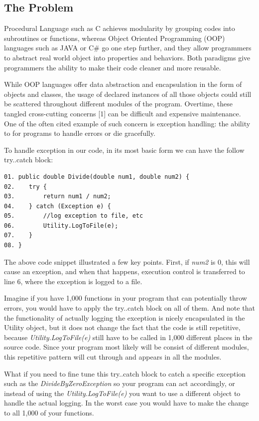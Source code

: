 \subsection{The Problem}
Procedural Language such as C achieves modularity by grouping codes into subroutines or functions, whereas Object Oriented Programming (OOP) languages such as JAVA or C\# go one step further, and they allow programmers to abstract real world object into properties and behaviors. Both paradigms give programmers the ability to make their code cleaner and more reusable.

While OOP languages offer data abstraction and encapsulation in the form of objects and classes, the usage of declared instances of all those objects could still be scattered throughout different modules of the program. Overtime, these tangled cross-cutting concerns [1] can be difficult and expensive maintenance. One of the often cited example of such concern is exception handling: the ability to for programs to handle errors or die gracefully.

To handle exception in our code, in its most basic form we can have the follow try..catch block:
\begin{verbatim}
01. public double Divide(double num1, double num2) {
02.    try {
03.        return num1 / num2;
04.    } catch (Exception e) {
05.        //log exception to file, etc
06.        Utility.LogToFile(e);
07.    }
08. }
\end{verbatim}

The above code snippet illustrated a few key points. First, if {\em num2} is 0, this will cause an exception, and when that happens, execution control is transferred to line 6, where the exception is logged to a file. 

Imagine if you have 1,000 functions in your program that can potentially throw errors, you would have to apply the try..catch block on all of them. And note that the functionality of actually logging the exception is nicely encapsulated in the Utility object, but it does not change the fact that the code is still repetitive, because {\em Utility.LogToFile(e)} still have to be called in 1,000 different places in the source code. Since your program most likely will be consist of different modules, this repetitive pattern will cut through and appears in all the modules.

What if you need to fine tune this try..catch block to catch a specific exception such as the {\em DivideByZeroException} so your program can act accordingly, or instead of using the {\em Utility.LogToFile(e)} you want to use a different object to handle the actual logging. In the worst case you would have to make the change to all 1,000 of your functions.

